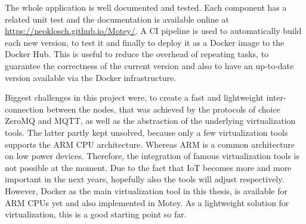 The whole application is well documented and tested.
Each component has a related unit test and the documentation is available online at \url{https://neoklosch.github.io/Motey/}.
A \ac{CI} pipeline is used to automatically build each new version, to test it and finally to deploy it as a Docker image to the Docker Hub.
This is useful to reduce the overhead of repeating tasks, to guarantee the correctness of the current version and also to have an up-to-date version available via the Docker infrastructure.

Biggest challenges in this project were, to create a fast and lightweight inter-connection between the nodes, that was achieved by the protocols of choice ZeroMQ and \ac{MQTT}, as well as the abstraction of the underlying virtualization tools.
The latter partly kept unsolved, because only a few virtualization tools supports the ARM \ac{CPU} architecture.
Whereas ARM is a common architecture on low power devices.
Therefore, the integration of famous virtualization tools is not possible at the moment.
Due to the fact that \ac{IoT} becomes more and more important in the next years, hopefully also the tools will adjust respectively.
However, Docker as the main virtualization tool in this thesis, is available for ARM \acp{CPU} yet and also implemented in Motey.
As a lightweight solution for virtualization, this is a good starting point so far.


%
%




